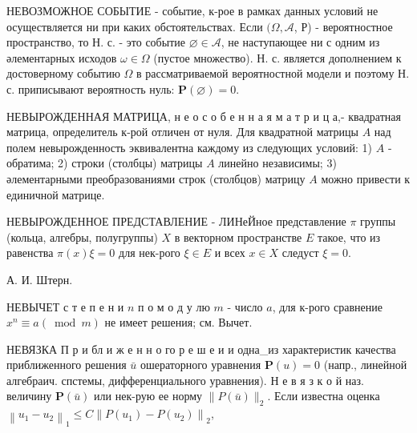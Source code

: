 \documentclass[10pt]{article}
\begin{document}
НЕВОЗМОЖНОЕ СОБЫТИЕ - событие, к-рое в рамках данных условий не осуществляется ни при каких обстоятельствах. Если $(\Omega, \mathcal{A}$, Р) - вероятностное пространство, то Н. с. - это событие $\varnothing \in \mathcal{A}$, не наступающее ни с одним из әлементарных исходов $\omega \in \Omega$ (пустое множество). Н. с. является дополнением к достоверному событию $\Omega$ в рассматриваемой вероятностной модели и поэтому Н. с. приписывают вероятность нуль: $\mathbf{P}(\varnothing)=0$.



НЕВЫРОЖДЕННАЯ МАТРИЦА, н е о с о б е н н а я м а т р и ц а,- квадратная матрица, определитель к-рой отличен от нуля. Для квадратной матрицы $A$ над полем невырожденность эквивалентна каждому из следующих условий: 1) $A$ - обратима; 2) строки (столбцы) матрицы $A$ линейно независимы; 3) әлементарными преобразованиями строк (столбцов) матрицу $A$ можно привести к единичной матрице.



НЕВЫРОЖДЕННОЕ ПРЕДСТАВЛЕНИЕ - ЛИНеЙное представление $\pi$ группы (кольца, алгебры, полугруппы) $X$ в векторном пространстве $E$ такое, что из равенства $\pi(x) \xi=0$ для нек-рого $\xi \in E$ и всех $x \in X$ следуст $\xi=0$.



А. И. Штерн.



НЕВЫЧЕТ с т е п е н и $n$ п о м о д у лю $m$ - число $a$, для к-рого сравнение $x^{n} \equiv a(\bmod m)$ не имеет решения; см. Вычет.



НЕВЯЗКА П р и бл и ж е н н о го р е ш е и и одна\_из характеристик качества приближенного решения $\bar{u}$ ошераторного уравнения $\boldsymbol{P}(u)=0$ (напр., линейной алгебраич. спстемы, дифференциального уравнения). Н е в я з к о й наз. величину $\boldsymbol{P}(\bar{u})$ или нек-рую ее норму $\|P(\bar{u})\|_{2}$. Если известна оценка $\left\|u_{1}-u_{2}\right\|_{1} \leqslant C\left\|P\left(u_{1}\right)-P\left(u_{2}\right)\right\|_{2}$,
\end{document}
